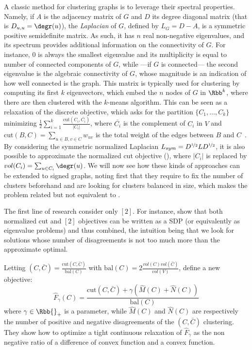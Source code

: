 A classic method for clustering graphs is to leverage their spectral properties. Namely, if $A$ is
the adjacency matrix of $G$ and $D$ its degree diagonal matrix (that is $D_{u,u} = \degr(u)$), the
\emph{Laplacian} of $G$, defined by $L_G = D - A$, is a symmetric positive semidefinite matrix. As
such, it has $n$ real non-negative eigenvalues, and its spectrum provides additional information on
the connectivity of $G$. For instance, $0$ is always the smallest eigenvalue and its multiplicity is
equal to number of connected components of $G$, while ---if $G$ is connected--- the second
eigenvalue is the algebraic connectivity of $G$, whose magnitude is an indication of how well
connected is the graph. This matrix is typically used for clustering by computing its first $k$
eigenvectors, which embed the $n$ nodes of $G$ in $\Rbb^k$, where there are then clustered with the
$k$-means algorithm. This can be seen as a relaxation of the discrete \rcut{} objective, which asks
for the partition $\{C_1, \ldots, C_k\}$ minimizing $\frac{1}{2}\sum_{i=1}^k \frac{\mathrm{cut}(C_i,
\bar{C_i})}{|C_i|}$, where $\bar{C_i}$ is the complement of $C_i$ in $V$ and $\mathrm{cut}(B, C) =
\sum_{u\in B, v\in C} w_{uv}$ is the total weight of the edges between $B$ and
$C$~\autocite{tutoSpectralClustering07}. By considering the symmetric normalized Laplacian
$L_{sym}  = D^{\nicefrac{1}{2}}LD^{\nicefrac{1}{2}}$, it is also possible to approximate the
normalized cut objective (\ncut{}), where $|C_i|$ is replaced by $vol(C_i) = \sum_{u\in C_i}
\degr(u)$. We will now see how these kinds of approaches can be extended to signed graphs, noting
first that they require to fix the number of clusters beforehand and are looking for clusters
balanced in size, which makes the problem related but not equivalent to \pcc{}.

The first line of research consider only \mind{}$[2]$. For instance, \textcite{NcutAnd2CC08} show
that both normalized cut and \mind{}$[2]$ objectives can be written as a SDP (or equivalently as
eigenvalue problems) and thus combined, the intuition being that we look for \ncut{} solutions whose
number of disagreements is not too much more than the approximate optimal.

Letting \ncut{}$(C, \bar{C}) = \frac{\mathrm{cut}(C, \bar{C})}{\mathrm{bal}(C)}$ with
$\mathrm{bal}(C) = 2\frac{vol(C)vol(\bar{C})}{vol(V)}$, \textcite{mOneCC12} define a new objective:
\begin{equation*}
  \hat{F}_\gamma(C) = \frac{\mathrm{cut}(C, \bar{C}) + \gamma\left(\hat{M}(C)+\hat{N}(C)\right)}{\mathrm{bal}(C)}
\end{equation*}
where $\gamma \in \Rbb{}_+$ is a parameter, while $\hat{M}(C)$ and $\hat{N}(C)$ are respectively the
number of positive and negative disagreements of the $(C, \bar{C})$ clustering.
They show how to optimize a tight continuous relaxation of $\hat{F}_\gamma$ as the non negative
ratio of a difference of convex function and a convex function.

